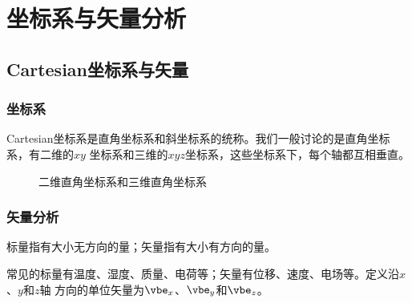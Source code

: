 \chapter{坐标系与矢量分析\label{chapter:reference}}

\section{Cartesian坐标系与矢量\label{section:reference-cartesian}}

\subsection{坐标系}
Cartesian坐标系是直角坐标系和斜坐标系的统称。我们一般讨论的是直角坐标系，有二维的$xy$
坐标系和三维的$xyz$坐标系，这些坐标系下，每个轴都互相垂直。
\begin{figure}[h]
    \centering
    \setlength{\abovecaptionskip}{0.2cm}
    \caption{二维直角坐标系和三维直角坐标系}
    \label{fig:CartesianCoord}
\end{figure}

\subsection{矢量分析}
\begin{definition}[标量和矢量]
    标量指有大小无方向的量；矢量指有大小有方向的量。 
\end{definition}
常见的标量有温度、湿度、质量、电荷等；矢量有位移、速度、电场等。定义沿$x$、$y$和$z$轴
方向的单位矢量为$\vbe_x$、$\vbe_y$和$\vbe_z$。


